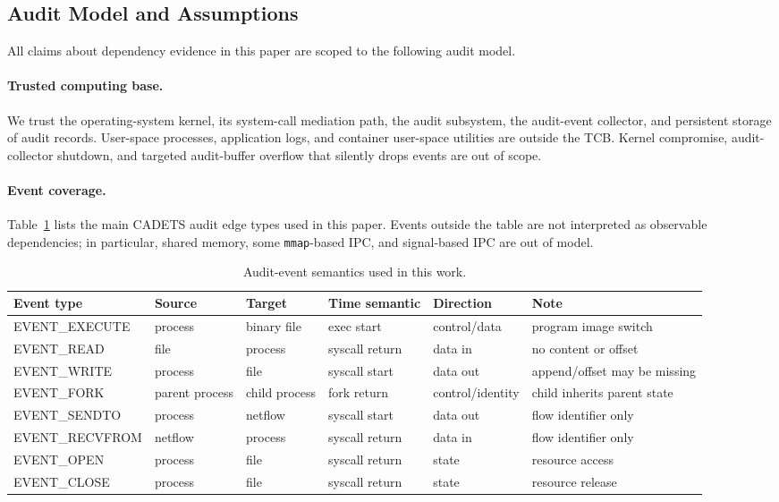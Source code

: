 \subsection{Audit Model and Assumptions}
\label{sec:audit_model}

All claims about dependency evidence in this paper are scoped to the following audit model.

\paragraph{Trusted computing base.} We trust the operating-system kernel, its system-call mediation path, the audit subsystem, the audit-event collector, and persistent storage of audit records. User-space processes, application logs, and container user-space utilities are outside the TCB. Kernel compromise, audit-collector shutdown, and targeted audit-buffer overflow that silently drops events are out of scope.

\paragraph{Event coverage.} Table~\ref{tab:event_semantics} lists the main CADETS audit edge types used in this paper. Events outside the table are not interpreted as observable dependencies; in particular, shared memory, some \texttt{mmap}-based IPC, and signal-based IPC are out of model.

\begin{table}[t]
\centering
\caption{Audit-event semantics used in this work.}
\label{tab:event_semantics}
\small
\begin{tabular}{llllll}
\toprule
Event type & Source & Target & Time semantic & Direction & Note \\
\midrule
EVENT\_EXECUTE & process & binary file & exec start & control/data & program image switch \\
EVENT\_READ & file & process & syscall return & data in & no content or offset \\
EVENT\_WRITE & process & file & syscall start & data out & append/offset may be missing \\
EVENT\_FORK & parent process & child process & fork return & control/identity & child inherits parent state \\
EVENT\_SENDTO & process & netflow & syscall start & data out & flow identifier only \\
EVENT\_RECVFROM & netflow & process & syscall return & data in & flow identifier only \\
EVENT\_OPEN & process & file & syscall return & state & resource access \\
EVENT\_CLOSE & process & file & syscall return & state & resource release \\
\bottomrule
\end{tabular}
\end{table}

